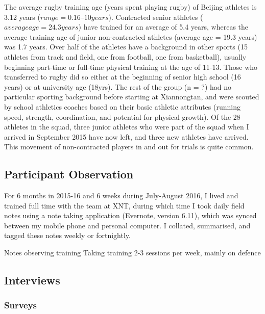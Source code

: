 The average rugby training age (years spent playing rugby) of Beijing athletes is 3.12 years ($range = 0.16 – 10 years$).  Contracted senior athletes ($average age = 24.3 years$) have trained for an average of 5.4 years, whereas the average training age of junior non-contracted athletes (average age = 19.3 years) was 1.7 years.  Over half of the athletes have a background in other sports (15 athletes from track and field, one from football, one from basketball), usually beginning part-time or full-time physical training at the age of 11-13.  Those who transferred to rugby did so either at the beginning of senior high school (16 years) or at university age (18yrs).  The rest of the group (n = ?) had no particular sporting background before starting at Xiannongtan, and were scouted by school athletics coaches based on their basic athletic attributes (running speed, strength, coordination, and potential for physical growth).  Of the 28 athletes in the squad, three junior athletes who were part of the squad when I arrived in September 2015 have now left, and three new athletes have arrived. This movement of non-contracted players in and out for trials is quite common.



      \subsection{Participant Observation}
      For 6 months in 2015-16 and 6 weeks during July-August 2016, I lived and trained full time with the team at XNT, during which time I took daily field notes using a note taking application (Evernote, version 6.11), which was synced between my mobile phone and personal computer. I collated, summarised, and tagged these notes weekly or fortnightly.

Notes observing training
Taking training 2-3 sessions per week, mainly on defence

      \subsection{Interviews}



      \subsubsection{Surveys}


